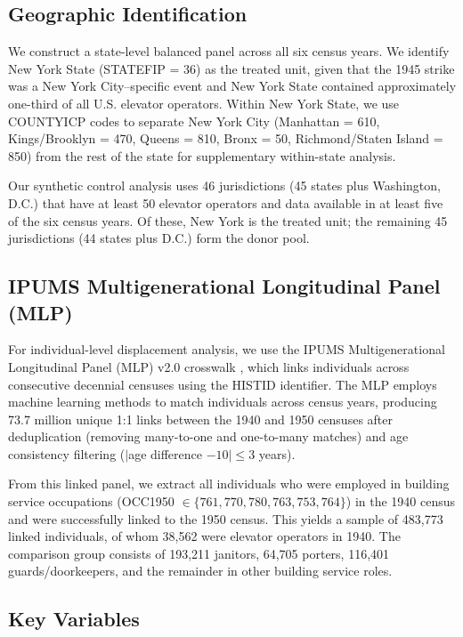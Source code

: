 \documentclass[12pt]{article}
\begin{document}
\subsection{Geographic Identification}

We construct a state-level balanced panel across all six census years. We identify New York State (STATEFIP = 36) as the treated unit, given that the 1945 strike was a New York City--specific event and New York State contained approximately one-third of all U.S. elevator operators. Within New York State, we use COUNTYICP codes to separate New York City (Manhattan = 610, Kings/Brooklyn = 470, Queens = 810, Bronx = 50, Richmond/Staten Island = 850) from the rest of the state for supplementary within-state analysis.

Our synthetic control analysis uses 46 jurisdictions (45 states plus Washington, D.C.) that have at least 50 elevator operators and data available in at least five of the six census years. Of these, New York is the treated unit; the remaining 45 jurisdictions (44 states plus D.C.) form the donor pool.

\subsection{IPUMS Multigenerational Longitudinal Panel (MLP)}

For individual-level displacement analysis, we use the IPUMS Multigenerational Longitudinal Panel (MLP) v2.0 crosswalk \citep{ruggles2021}, which links individuals across consecutive decennial censuses using the HISTID identifier. The MLP employs machine learning methods to match individuals across census years, producing 73.7 million unique 1:1 links between the 1940 and 1950 censuses after deduplication (removing many-to-one and one-to-many matches) and age consistency filtering ($|$age difference $- 10| \leq 3$ years).

From this linked panel, we extract all individuals who were employed in building service occupations (OCC1950 $\in \{761, 770, 780, 763, 753, 764\}$) in the 1940 census and were successfully linked to the 1950 census. This yields a sample of 483,773 linked individuals, of whom 38,562 were elevator operators in 1940. The comparison group consists of 193,211 janitors, 64,705 porters, 116,401 guards/doorkeepers, and the remainder in other building service roles.

\subsection{Key Variables}
\end{document}
